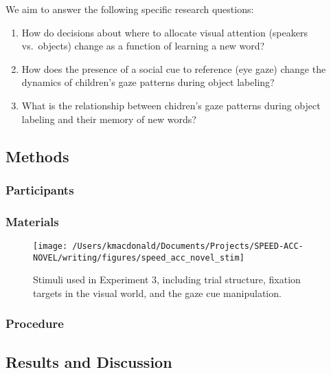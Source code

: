 \documentclass[man,floatsintext]{apa6}
\providecommand{\tightlist}{%
  \setlength{\itemsep}{0pt}\setlength{\parskip}{0pt}}
\begin{document}
\noindent We aim to answer the following specific research questions:

\begin{enumerate}
\def\labelenumi{\arabic{enumi}.}
\tightlist
\item
  How do decisions about where to allocate visual attention (speakers
  vs.~objects) change as a function of learning a new word?
\item
  How does the presence of a social cue to reference (eye gaze) change
  the dynamics of children's gaze patterns during object labeling?
\item
  What is the relationship between chidren's gaze patterns during object
  labeling and their memory of new words?
\end{enumerate}

\hypertarget{methods-2}{%
\subsection{Methods}\label{methods-2}}

\hypertarget{participants-2}{%
\subsubsection{Participants}\label{participants-2}}

\hypertarget{materials-2}{%
\subsubsection{Materials}\label{materials-2}}

\begin{figure}[!t]

{\centering \texttt{[image: /Users/kmacdonald/Documents/Projects/SPEED-ACC-NOVEL/writing/figures/speed\_acc\_novel\_stim]} 

}

\caption{Stimuli used in Experiment 3, including trial structure, fixation targets in the visual world, and the gaze cue manipulation.}\label{fig:speed-acc-novel-stimuli}
\end{figure}

\hypertarget{procedure-2}{%
\subsubsection{Procedure}\label{procedure-2}}

\hypertarget{results-and-discussion-2}{%
\subsection{Results and Discussion}\label{results-and-discussion-2}}
\end{document}
